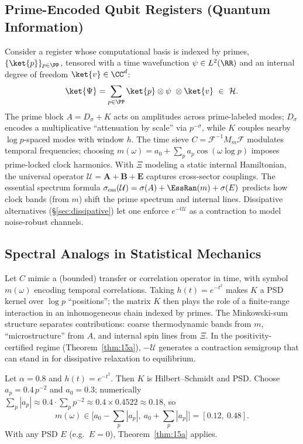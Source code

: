 \documentclass[12]{amsart}
\theoremstyle{plain}
\begin{document}
\subsection{Prime-Encoded Qubit Registers (Quantum Information)}
Consider a register whose computational basis is indexed by primes, 
$\{\ket{p}\}_{p\in\PP}$, tensored with a time wavefunction $\psi\in L^2(\RR)$ and an internal degree of freedom $\ket{v}\in\CC^d$:
\[
\ket{\Psi}=\sum_{p\in\PP}\ket{p}\otimes \psi\ \otimes \ket{v}\ \in\ \mathcal H.
\]
The prime block \(A=D_\sigma+K\) acts on amplitudes across prime-labeled modes; 
\(D_\sigma\) encodes a multiplicative “attenuation by scale” via \(p^{-\sigma}\), while \(K\) couples nearby \(\log p\)-spaced modes with window \(h\).
The time sieve \(C=\mathcal F^{-1}M_m\mathcal F\) modulates temporal frequencies; choosing 
\(m(\omega)=a_0+\sum_p a_p\cos(\omega\log p)\) imposes prime-locked clock harmonics.
With $\Xi$ modeling a static internal Hamiltonian, the universal operator
\(
\mathcal U=\mathbf A+\mathbf B+\mathbf E
\)
captures cross-sector couplings. 
The essential spectrum formula
\(
\sigma_{\mathrm{ess}}(\mathcal U)=\sigma(A)+\EssRan(m)+\sigma(E)
\)
predicts how clock bands (from $m$) shift the prime spectrum and internal lines. 
Dissipative alternatives (\S\ref{sec:dissipative}) let one enforce $e^{-t\mathcal U}$ as a contraction to model noise-robust channels.

\subsection{Spectral Analogs in Statistical Mechanics}
Let $C$ mimic a (bounded) transfer or correlation operator in time, with symbol $m(\omega)$ encoding temporal correlations. 
Taking \(h(t)=e^{-t^2}\) makes \(K\) a PSD kernel over \(\log p\) “positions”; 
the matrix \(K\) then plays the role of a finite-range interaction in an inhomogeneous chain indexed by primes. 
The Minkowski-sum structure separates contributions: coarse thermodynamic bands from \(m\), “microstructure” from \(A\), and internal spin lines from \(\Xi\).
In the positivity-certified regime (Theorem~\ref{thm:15a}), 
\(-\mathcal U\) generates a contraction semigroup that can stand in for dissipative relaxation to equilibrium.

\begin{example}
Let $\alpha=0.8$ and $h(t)=e^{-t^2}$. Then $K$ is Hilbert--Schmidt and PSD.
Choose $a_p=0.4\,p^{-2}$ and $a_0=0.3$; numerically $\sum_{p}|a_p|\approx 0.4\cdot \sum_{p}p^{-2}\approx 0.4\times 0.4522\approx 0.18$,
so
\[
m(\omega)\in\big[a_0-\!\sum_p|a_p|,\ a_0+\!\sum_p|a_p|\big]=[0.12,\ 0.48].
\]
With any PSD $E$ (e.g.\ $E=0$), Theorem~\ref{thm:15a} applies.
\end{example}
\end{document}
